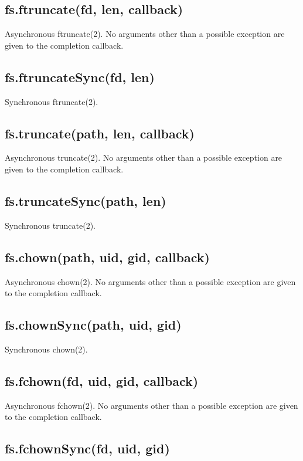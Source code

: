 \subsection{fs.ftruncate(fd, len, callback)}

Asynchronous ftruncate(2). No arguments other than a possible exception
are given to the completion callback.

\subsection{fs.ftruncateSync(fd, len)}

Synchronous ftruncate(2).

\subsection{fs.truncate(path, len, callback)}

Asynchronous truncate(2). No arguments other than a possible exception
are given to the completion callback.

\subsection{fs.truncateSync(path, len)}

Synchronous truncate(2).

\subsection{fs.chown(path, uid, gid, callback)}

Asynchronous chown(2). No arguments other than a possible exception are
given to the completion callback.

\subsection{fs.chownSync(path, uid, gid)}

Synchronous chown(2).

\subsection{fs.fchown(fd, uid, gid, callback)}

Asynchronous fchown(2). No arguments other than a possible exception are
given to the completion callback.

\subsection{fs.fchownSync(fd, uid, gid)}

